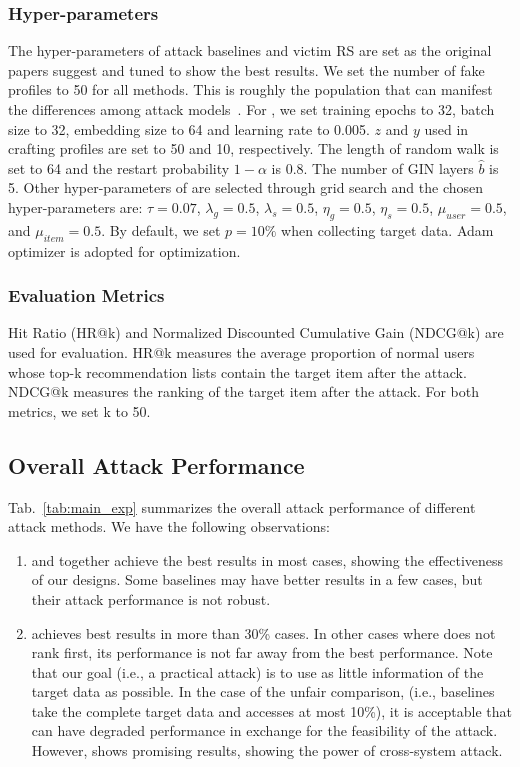 \subsubsection{Hyper-parameters}
The hyper-parameters of attack baselines and victim RS are set as the original papers suggest and tuned to show the best results.
We set the number of fake profiles to 50 for all methods. 
This is roughly the population that can manifest the differences among attack models~\citep{BurkeMBW05}.
For \ours, we set training epochs to 32, batch size to 32, embedding size to 64 and learning rate to 0.005.
$z$ and $y$ used in crafting profiles are set to 50 and 10, respectively. 
The length of random walk is set to 64 and the restart probability $1-\alpha$ is 0.8.
The number of GIN layers $\hat{b}$ is 5.
Other hyper-parameters of \ours are selected through grid search and the chosen hyper-parameters are:
$\tau=0.07$, $\lambda_g=0.5$, $\lambda_s=0.5$, $\eta_g=0.5$, $\eta_s=0.5$, $\mu_{user}=0.5$, and $\mu_{item}=0.5$.
By default, we set $p=10\%$ when collecting target data.
Adam optimizer is adopted for optimization.


\subsubsection{Evaluation Metrics}
Hit Ratio (HR@k) and Normalized Discounted Cumulative Gain (NDCG@k) are used for evaluation.  
HR@k measures the average proportion of normal users whose top-k recommendation lists contain the target item after the attack.
NDCG@k measures the ranking of the target item after the attack.
For both metrics, we set k to 50.


\subsection{Overall Attack Performance}

Tab.~\ref{tab:main_exp} summarizes the overall attack performance of different attack methods.
We have the following observations:
\begin{enumerate}
	\item \oursstar and \ours together achieve the best results in most cases, showing the effectiveness of our designs. Some baselines may have better results in a few cases, but their attack performance is not robust.

	\item \ours achieves best results in more than 30\% cases. In other cases where \ours does not rank first, its performance is not far away from the best performance. Note that our goal (i.e., a practical attack) is to use as little information of the target data as possible. In the case of the unfair comparison, (i.e., baselines take the complete target data and \ours accesses at most 10\%), it is acceptable that \ours can have degraded performance in exchange for the feasibility of the attack. However, \ours shows promising results, showing the power of cross-system attack.
\end{enumerate}





